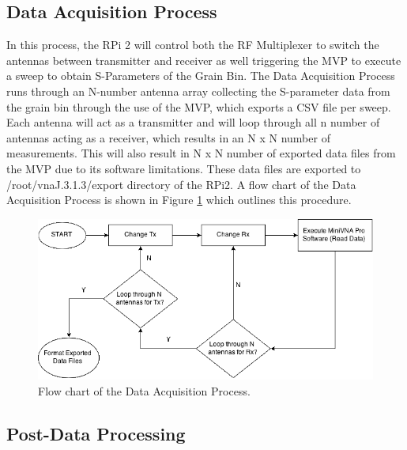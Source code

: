 \subsection{Data Acquisition Process}

In this process, the RPi 2 will control both the RF Multiplexer to switch the antennas between transmitter and receiver as
well triggering the MVP to execute a sweep to obtain S-Parameters of the Grain Bin.  The Data Acquisition Process runs
through an N-number antenna array collecting the S-parameter data from the grain bin through the use of the MVP, which
exports a CSV file per sweep.  Each antenna will act as a transmitter and will loop through all n number of antennas acting
as a receiver, which results in an N x N number of measurements.  This will also result in N x N number of exported data
files from the MVP due to its software limitations.  These data files are exported to
/root/vnaJ.3.1.3/export directory of the RPi2.  A flow chart of the Data
Acquisition Process is shown in Figure \ref{fig:switch} which outlines this procedure.

\begin{figure}[h]
\begin{center}
\includegraphics[width=5in]{./images/switch.png}
\caption{Flow chart of the Data Acquisition Process.}
\label{fig:switch}
\end{center}
\end{figure}

\subsection{Post-Data Processing}

